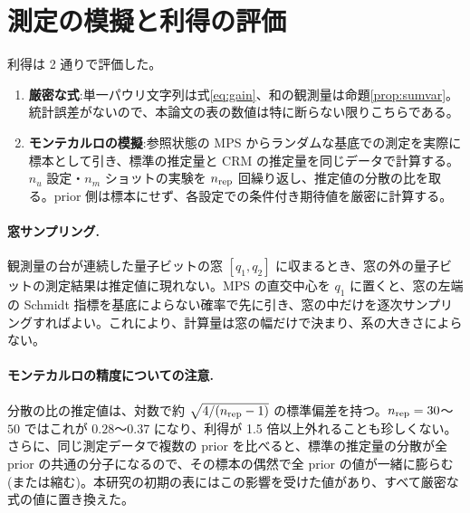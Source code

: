 \section{測定の模擬と利得の評価}
\label{sec:simulation}

利得は 2 通りで評価した。
\begin{enumerate}
  \item \textbf{厳密な式}:単一パウリ文字列は式\eqref{eq:gain}、和の観測量は命題\ref{prop:sumvar}。統計誤差がないので、本論文の表の数値は特に断らない限りこちらである。
  \item \textbf{モンテカルロの模擬}:参照状態の MPS からランダムな基底での測定を実際に標本として引き、標準の推定量と CRM の推定量を同じデータで計算する。$n_u$ 設定・$n_m$ ショットの実験を $n_{\rm rep}$ 回繰り返し、推定値の分散の比を取る。prior 側は標本にせず、各設定での条件付き期待値を厳密に計算する。
\end{enumerate}

\paragraph{窓サンプリング.}観測量の台が連続した量子ビットの窓 $[q_1,q_2]$ に収まるとき、窓の外の量子ビットの測定結果は推定値に現れない。MPS の直交中心を $q_1$ に置くと、窓の左端の Schmidt 指標を基底によらない確率で先に引き、窓の中だけを逐次サンプリングすればよい。これにより、計算量は窓の幅だけで決まり、系の大きさによらない。

\paragraph{モンテカルロの精度についての注意.}分散の比の推定値は、対数で約 $\sqrt{4/(n_{\rm rep}-1)}$ の標準偏差を持つ。$n_{\rm rep}=30$〜$50$ ではこれが $0.28$〜$0.37$ になり、利得が 1.5 倍以上外れることも珍しくない。さらに、同じ測定データで複数の prior を比べると、標準の推定量の分散が全 prior の共通の分子になるので、その標本の偶然で全 prior の値が一緒に膨らむ(または縮む)。本研究の初期の表にはこの影響を受けた値があり、すべて厳密な式の値に置き換えた。
